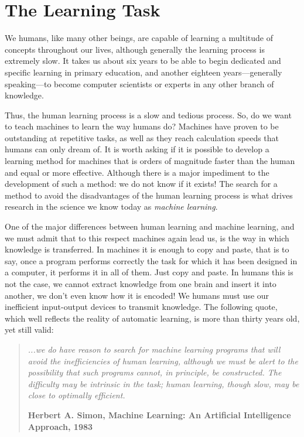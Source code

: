 \section{The Learning Task}

We humans, like many other beings, are capable of learning a multitude of concepts throughout our lives, although generally the learning process is extremely slow. It takes us about six years to be able to begin dedicated and specific learning in primary education, and another eighteen years---generally speaking---to become computer scientists or experts in any other branch of knowledge.

Thus, the human learning process is a slow and tedious process. So, do we want to teach machines to learn the way humans do? Machines have proven to be outstanding at repetitive tasks, as well as they reach calculation speeds that humans can only dream of. It is worth asking if it is possible to develop a learning method for machines that is orders of magnitude faster than the human and equal or more effective. Although there is a major impediment to the development of such a method: we do not know if it exists! The search for a method to avoid the disadvantages of the human learning process is what drives research in the science we know today as \textit{machine learning}. 

One of the major differences between human learning and machine learning, and we must admit that to this respect machines again lead us, is the way in which knowledge is transferred. In machines it is enough to copy and paste, that is to say, once a program performs correctly the task for which it has been designed in a computer, it performs it in all of them. Just copy and paste. In humans this is not the case, we cannot extract knowledge from one brain and insert it into another, we don't even know how it is encoded! We humans must use our inefficient input-output devices to transmit knowledge. The following quote, which well reflects the reality of automatic learning, is more than thirty years old, yet still valid:

\begin{quotation}{\slshape
		...we do have reason to search for machine learning programs that will avoid the inefficiencies of human learning, although we must be alert to the possibility that such programs cannot, in principle, be constructed. The difficulty may be intrinsic in the task; human learning, though slow, may be close to optimally efficient.}
	\begin{flushright}
		\textbf{Herbert A. Simon, Machine Learning: An Artificial Intelligence Approach, 1983} 
	\end{flushright}
\end{quotation}

